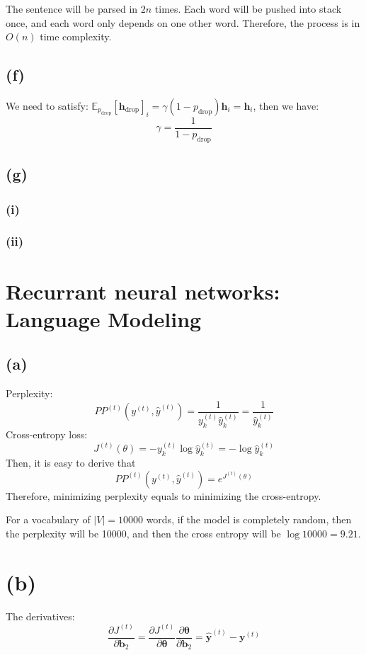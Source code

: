 \documentclass[12pt]{article}
\begin{document}
The sentence will be parsed in $2n$ times. Each word will be pushed into stack once, and each word only depends on one other word. Therefore, the process is in $O(n)$ time complexity.   

\subsection*{(f)}

We need to satisfy: 
$\mathbb{E}_{p_{\mathrm{drop}}}[\bm h_{\mathrm{drop}}]_i = \gamma (1-p_{\mathrm{drop}}) \bm h_i = \bm h_i$, then we have:  
                        $$\gamma = \frac{1}{1 - p_{\mathrm{drop}}}$$


\subsection*{(g)}
\subsubsection*{(i)}

\subsubsection*{(ii)}

\section{Recurrant neural networks: Language Modeling}

\subsection*{(a)}
Perplexity:
$$
PP^{(t)} \left (y^{(t)}, \hat y^{(t)} \right) = \frac{1}{y_k^{(t)} \hat y_k^{(t)}} = \frac{1}{\hat y_k^{(t)}}
$$
Cross-entropy loss:
$$
J^{(t)}(\theta) = -y_k^{(t)} \log \hat y_k^{(t)} = -\log \hat y_k^{(t)}
$$
Then, it is easy to derive that
$$
PP^{(t)} \left (y^{(t)}, \hat y^{(t)} \right) = e^{J^{(t)}(\theta)}
$$
Therefore, minimizing perplexity equals to minimizing the cross-entropy.

For a vocabulary of $|V| = 10000$ words, if the model is completely random, then the perplexity will be 10000, and then the cross entropy will be $\log 10000 = 9.21$.

\section*{(b)}

The derivatives:
$$
\frac{\partial J^{(t)}}{\partial \bm b_2} = \frac{\partial J^{(t)}}{\partial \bm \theta} \frac{\partial \bm \theta}{\partial \bm b_2} = \bm {\hat y}^{(t)} - \bm y^{(t)}
$$
\end{document}
